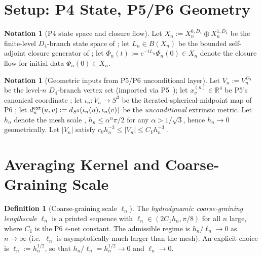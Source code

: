 \documentclass[11pt, a4paper]{amsart}
\theoremstyle{definition}
\newtheorem{definition}[theorem]{Definition}
\newtheorem{notation}[theorem]{Notation}
\newcommand{\R}{\mathbb{R}}
\newcommand{\dsph}{d_{S^3}}
\begin{document}
\section{Setup: P4 State, P5/P6 Geometry}
\label{sec:setup}

\begin{notation}[P4 state space and closure flow]
\label{not:P4}
Let $X_n := X_n^{0, D_4} \oplus X_n^{1, D_4}$ be the
finite-level $D_4$-branch state space of
\cite[Def.~2.1]{ClosureDynamics}; let $L_n \in B(X_n)$ be the
bounded self-adjoint closure generator of
\cite[Thm.~3.1]{ClosureDynamics}; let $\Phi_n(t) := e^{-t L_n}
\Phi_n(0) \in X_n$ denote the closure flow for initial data
$\Phi_n(0) \in X_n$.
\end{notation}

\begin{notation}[Geometric inputs from P5/P6 unconditional layer]
\label{not:geom}
Let $V_n := V_n^{D_4}$ be the level-$n$ $D_4$-branch vertex set
(imported via P5~\cite[Notation~2.1]{MetricProjection}); let
$x_v^{(n)} \in \R^4$ be
P5's canonical coordinate \cite[Notation~2.1]{MetricProjection};
let $\iota_n \colon V_n \to S^3$ be the iterated-spherical-midpoint
map of P6 \cite[Def.~3.2]{SchlafliConvergence}; let $d_n^{\rm
ext}(u, v) := \dsph(\iota_n(u), \iota_n(v))$ be the
\emph{unconditional} extrinsic metric. Let $h_n$ denote the mesh
scale \cite[Def.~3.4]{SchlafliConvergence}, $h_n \leq
\alpha^n \pi/2$ for any $\alpha > 1/\sqrt 3$, hence $h_n \to 0$
geometrically. Let $|V_n|$ satisfy $c_V h_n^{-3} \leq |V_n| \leq
C_V h_n^{-3}$ \cite[Lem.~6.2]{SchlafliConvergence}.
\end{notation}

\section{Averaging Kernel and Coarse-Graining Scale}
\label{sec:kernel}

\begin{definition}[Coarse-graining scale $\ell_n$]
\label{def:ell-n}
The \emph{hydrodynamic coarse-graining lengthscale} $\ell_n$ is
a printed sequence with $\ell_n \in (2 C_1 h_n, \pi/8)$ for all
$n$ large, where $C_1$ is the P6 $\varepsilon$-net constant. The
admissible regime is $h_n / \ell_n \to 0$ as $n \to \infty$
(i.e.\ $\ell_n$ is asymptotically much larger than the mesh).
An explicit choice is $\ell_n := h_n^{1/2}$, so that $h_n /
\ell_n = h_n^{1/2} \to 0$ and $\ell_n \to 0$.
\end{definition}
\end{document}
